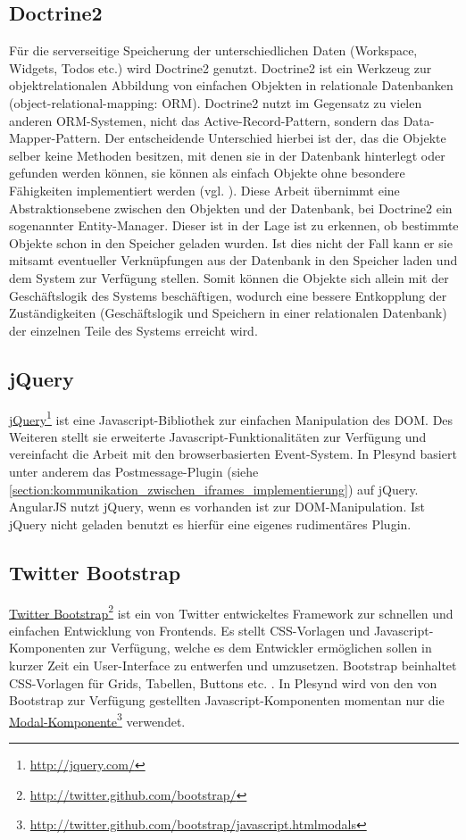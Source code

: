 \subsection{Doctrine2}\label{section:doctrine2}
Für die serverseitige Speicherung der unterschiedlichen Daten (Workspace, Widgets, Todos etc.) wird Doctrine2 genutzt. Doctrine2 ist ein Werkzeug zur objektrelationalen Abbildung von einfachen Objekten in relationale Datenbanken (object-relational-mapping: ORM). Doctrine2 nutzt im Gegensatz zu vielen anderen ORM-Systemen, nicht das Active-Record-Pattern, sondern das Data-Mapper-Pattern. Der entscheidende Unterschied hierbei ist der, das die Objekte selber keine Methoden besitzen, mit denen sie in der Datenbank hinterlegt oder gefunden werden können, sie können als einfach Objekte ohne besondere Fähigkeiten implementiert werden (vgl. \cite{Fowler2002}). Diese Arbeit übernimmt eine Abstraktionsebene zwischen den Objekten und der Datenbank, bei Doctrine2 ein sogenannter Entity-Manager. Dieser ist in der Lage ist zu erkennen, ob bestimmte Objekte schon in den Speicher geladen wurden. Ist dies nicht der Fall kann er sie mitsamt eventueller Verknüpfungen aus der Datenbank in den Speicher laden und dem System zur Verfügung stellen. Somit können die Objekte sich allein mit der Geschäftslogik des Systems beschäftigen, wodurch eine bessere Entkopplung der Zuständigkeiten (Geschäftslogik und Speichern in einer relationalen Datenbank) der einzelnen Teile des Systems erreicht wird.

\subsection{jQuery}
\href{http://jquery.com/}{jQuery}\footnote{\url{http://jquery.com/}} ist eine Javascript-Bibliothek zur einfachen Manipulation des DOM. Des Weiteren stellt sie erweiterte Javascript-Funktionalitäten zur Verfügung und vereinfacht die Arbeit mit den browserbasierten Event-System. In Plesynd basiert unter anderem das Postmessage-Plugin (siehe \ref{section:kommunikation_zwischen_iframes_implementierung}) auf jQuery. AngularJS nutzt jQuery, wenn es vorhanden ist zur DOM-Manipulation. Ist jQuery nicht geladen benutzt es hierfür eine eigenes rudimentäres Plugin.

\subsection{Twitter Bootstrap}
\href{http://twitter.github.com/bootstrap/}{Twitter Bootstrap}\footnote{\url{http://twitter.github.com/bootstrap/}} ist ein von Twitter entwickeltes Framework zur schnellen und einfachen Entwicklung von Frontends. Es stellt CSS-Vorlagen und Javascript-Komponenten zur Verfügung, welche es dem Entwickler ermöglichen sollen in kurzer Zeit ein User-Interface zu entwerfen und umzusetzen. Bootstrap beinhaltet CSS-Vorlagen für Grids, Tabellen, Buttons etc. . In Plesynd wird von den von Bootstrap zur Verfügung gestellten Javascript-Komponenten momentan nur die \href{http://twitter.github.com/bootstrap/javascript.htmlmodals}{Modal-Komponente}\footnote{\url{http://twitter.github.com/bootstrap/javascript.htmlmodals}} verwendet. 

